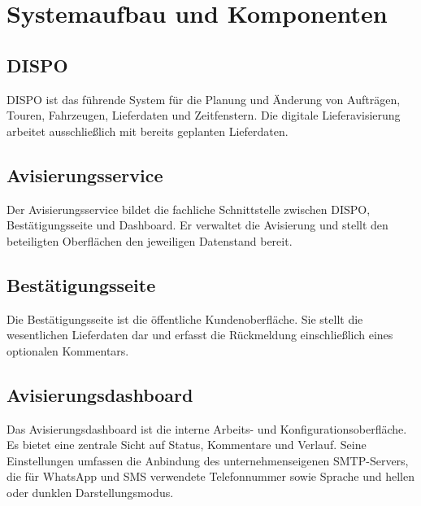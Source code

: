 \section{Systemaufbau und Komponenten}

\subsection{DISPO}

DISPO ist das führende System für die Planung und Änderung von Aufträgen, Touren, Fahrzeugen,
Lieferdaten und Zeitfenstern. Die digitale Lieferavisierung arbeitet ausschließlich mit bereits
geplanten Lieferdaten.

\subsection{Avisierungsservice}

Der Avisierungsservice bildet die fachliche Schnittstelle zwischen DISPO,
Bestätigungsseite und Dashboard. Er verwaltet die Avisierung und stellt den beteiligten
Oberflächen den jeweiligen Datenstand bereit.

\subsection{Bestätigungsseite}

Die Bestätigungsseite ist die öffentliche Kundenoberfläche. Sie stellt die wesentlichen
Lieferdaten dar und erfasst die Rückmeldung einschließlich eines optionalen Kommentars.

\subsection{Avisierungsdashboard}

Das Avisierungsdashboard ist die interne Arbeits- und Konfigurationsoberfläche. Es bietet eine
zentrale Sicht auf Status, Kommentare und Verlauf. Seine Einstellungen umfassen die Anbindung
des unternehmenseigenen SMTP-Servers, die für WhatsApp und SMS verwendete Telefonnummer sowie
Sprache und hellen oder dunklen Darstellungsmodus.


